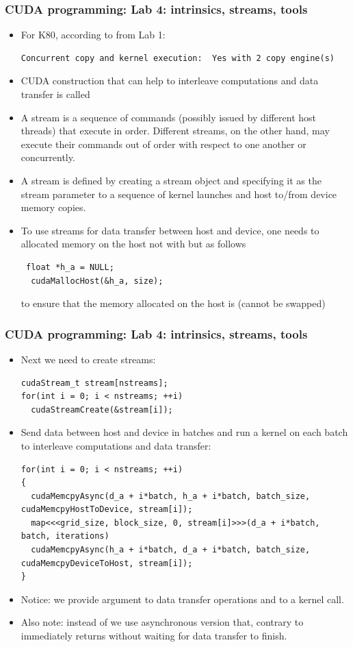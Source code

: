 \begin{frame}[fragile]
  \frametitle{CUDA programming: Lab 4: intrinsics, streams, tools}
\begin{itemize}
\item For K80, according to  from Lab 1:
{\tiny
{\color{mycolorcli}
\begin{verbatim}
Concurrent copy and kernel execution:  Yes with 2 copy engine(s)
\end{verbatim}
}
}
\item CUDA construction that can help to interleave computations and data transfer is called 
\item A stream is a sequence of commands (possibly issued by different host threads) that
execute in order. Different streams, on the other hand, may execute their commands out
of order with respect to one another or concurrently.
\item A stream is defined by creating a stream object and specifying it as the stream parameter
to a sequence of kernel launches and host to/from device memory copies.
\item To use streams for data transfer between host and device, one needs to allocated memory on the host not with  but as follows
{\color{mycolorcode}
\begin{verbatim}
 float *h_a = NULL;
  cudaMallocHost(&h_a, size);
\end{verbatim}
}
to ensure that the memory allocated on the host is  (cannot be swapped)
\end{itemize}
\end{frame}


\begin{frame}[fragile]
  \frametitle{CUDA programming: Lab 4: intrinsics, streams, tools}
\begin{itemize}
\item Next we need to create streams:
{\color{mycolorcode}
\begin{verbatim}
cudaStream_t stream[nstreams];
for(int i = 0; i < nstreams; ++i)
  cudaStreamCreate(&stream[i]);
\end{verbatim}
}
\item Send data between host and device in batches and run a kernel on each batch to interleave computations and data transfer:
{\tiny
{\color{mycolorcode}
\begin{verbatim}
for(int i = 0; i < nstreams; ++i)
{
  cudaMemcpyAsync(d_a + i*batch, h_a + i*batch, batch_size, cudaMemcpyHostToDevice, stream[i]);
  map<<<grid_size, block_size, 0, stream[i]>>>(d_a + i*batch, batch, iterations)
  cudaMemcpyAsync(h_a + i*batch, d_a + i*batch, batch_size, cudaMemcpyDeviceToHost, stream[i]);
}
\end{verbatim}
}
}
\item Notice: we provide  argument to data transfer operations and to a kernel call.
\item Also note: instead of  we use asynchronous version  that, contrary to  immediately returns without waiting for data transfer to finish.
\end{itemize}
\end{frame}

